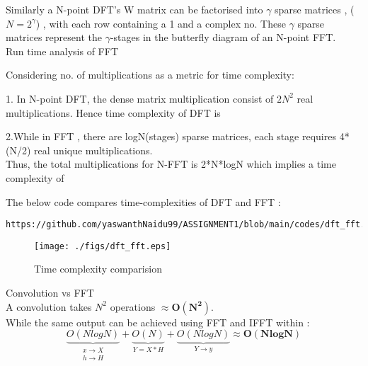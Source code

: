 \documentclass[journal,12pt,twocolumn]{IEEEtran}
\begin{document}
Similarly a N-point DFT's W matrix can be factorised into $\gamma$ sparse matrices , ($N = 2^{\gamma}$) , with each row containing a 1 and a complex no. These $\gamma$ sparse matrices represent the $\gamma$-stages in the butterfly diagram of an N-point FFT.\\

Run time analysis of FFT  \bigskip

Considering no. of multiplications as a metric for time complexity:

1. In N-point DFT, the dense matrix multiplication consist of $2N^{2}$ real multiplications.
Hence time complexity of DFT is  \bigskip

2.While in FFT , there are logN(stages) sparse matrices, each stage requires 4*(N/2) real unique multiplications.\\
Thus, the total multiplications for N-FFT is 2*N*logN  which implies a time complexity of \bigskip

The below code compares time-complexities of DFT and FFT  :\begin{lstlisting}
https://github.com/yaswanthNaidu99/ASSIGNMENT1/blob/main/codes/dft_fft.py
\end{lstlisting}
 
 \begin{figure}[!ht]
	\texttt{[image: ./figs/dft\_fft.eps]}
	\caption{Time complexity comparision}
\end{figure}

Convolution vs FFT\\
A convolution takes $ N^{2}$ operations $\approx \boldsymbol{O(N^{2})}$.\\
While the same output can be achieved using FFT and IFFT within : 
\begin{equation}
   \underbrace{O(NlogN)}_{\substack{\text{$x \rightarrow X$} \\ {\text{$h \rightarrow H $}}  }} + 
   \underbrace{O(N)}_{\text{$Y = X*H$}} + 
   \underbrace{O(NlogN)}_{\text{$Y \rightarrow y$}} \approx \boldsymbol{O(NlogN)}
\end{equation}
\end{document}
